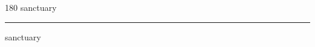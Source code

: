 
\begin{frame}
\begin{center}
\begin{turn}{180}
{\fontsize{2.5cm}{1em}\selectfont sanctuary}
\end{turn}
\vspace{1em}\par  
\hrule
\vspace{1em}\par  
{\fontsize{2.5cm}{1em}\selectfont sanctuary}
\end{center}
\end{frame}
